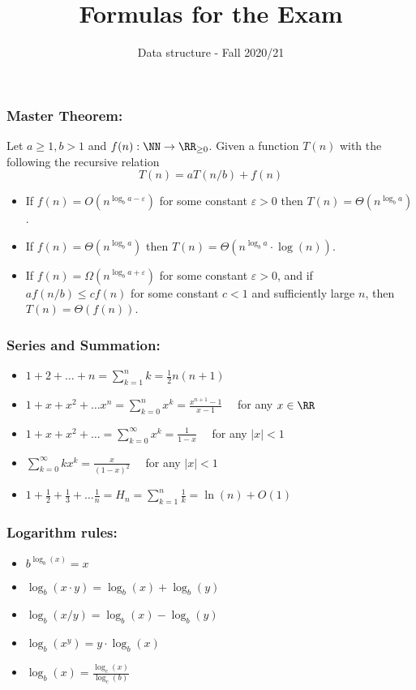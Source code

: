 \title{Formulas for the Exam}
\date{}
\author{Data structure - Fall 2020/21}
\maketitle
\subsubsection*{Master Theorem:}
 Let $a\geq 1, b > 1$ and $f(n): \NN\to
\RR_{\geq 0}$. Given a function $T
(n)$ with the
following
the recursive relation
    \[
        T(n) = aT(n/b) + f(n)
    \]
    \begin{itemize}
        \item If $\displaystyle f(n) = O(n^{\log_b a - \varepsilon})$ for
        some constant $\varepsilon > 0$ then $T(n) = \Theta(n^{\log_b a})$.
        \item If $\displaystyle f(n) = \Theta(n^{\log_b a})$ then
        $T(n) = \Theta(n^{\log_b a}\cdot \log(n))$.
        \item If $\displaystyle f(n) = \Omega(n^{\log_b a + \varepsilon})$ for
        some constant $\varepsilon > 0$, and if $af(n/b) \leq cf(n)$ for some
        constant $c<1$ and sufficiently large $n$, then $T(n) = \Theta(f(n))$.
    \end{itemize}
\subsubsection*{Series and Summation:}
\begin{itemize}
    \item $\displaystyle 1+2+\ldots + n = \sum_{k=1}^n k=  \frac{1}{2}n(n+1)$
    \item $\displaystyle 1+x+x^2+\ldots x^n= \sum_{k=0}^n x^k =  \frac{x^{n+1}
    - 1}{x-1}\quad $ for any $x\in \RR$
    \item $\displaystyle 1+x+x^2+\ldots=\sum_{k=0}^\infty x^k =
    \frac{1}{1-x}\quad$ for any $|x| < 1$
    \item $\displaystyle \sum_{k=0}^\infty kx^k=
    \frac{x}{(1-x)^2}\quad$ for any $|x| < 1$
    \item $\displaystyle 1+\frac{1}{2} + \frac{1}{3} + \ldots
    \frac{1}{n} = H_n =
    \sum_{k=1}^{n}\frac{1}{k}  = \ln(n) + O(1)$
\end{itemize}
\subsubsection*{Logarithm rules:}
\begin{itemize}
    \item $\displaystyle
 b^{\log_b(x)} = x$
    \item $\displaystyle
 \log_b(x \cdot y) = \log_b(x) + \log_b(y)$
    \item $\displaystyle
 \log_b(x/y) = \log_b(x) - \log_b(y)$
    \item $\displaystyle
 \log_b(x^y) = y\cdot \log_b(x)$
    \item $\displaystyle
 \log_b(x) = \frac{\log_c(x)}{\log_c(b)}$
\end{itemize}